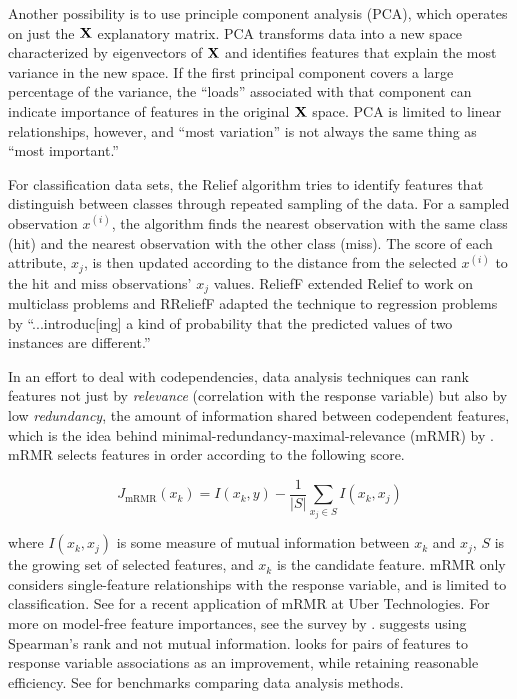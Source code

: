 \documentclass[smallextended]{svjour3}       %
\renewcommand{\xi}{x^{(i)}}
\begin{document}
Another possibility is to use principle component analysis (PCA), which operates on just the $\bf X$ explanatory matrix. PCA transforms data into a new space characterized by eigenvectors of $\bf X$ and identifies features that explain the most variance in the new space. If the first principal component covers a large percentage of the variance, the ``loads'' associated with that component can indicate importance of features in the original $\bf X$ space. PCA is limited to linear relationships, however, and ``most variation'' is not always the same thing as ``most important.''

For classification data sets, the Relief algorithm \citep{relief} tries to identify features that distinguish between classes through repeated sampling of the data. For a sampled observation $\xi$, the algorithm finds the nearest observation with the same class (hit) and the nearest observation with the other class (miss). The score of each attribute, $x_j$, is then updated according to the distance from the selected $\xi$ to the hit and miss observations'  $x_j$ values. ReliefF \citep{ReliefF} extended Relief to work on multiclass problems and RReliefF \citep{RReliefF} adapted the technique to regression problems by ``...introduc[ing] a kind of probability that the predicted values of two instances are different.''

In an effort to deal with codependencies, data analysis techniques can rank features not just by {\em relevance} (correlation with the response variable) but also by low {\em redundancy}, the amount of information shared between codependent features, which is the idea behind minimal-redundancy-maximal-relevance (mRMR) by \citet{mRMR}. mRMR selects features in order according to the following score.

\[
J_{\text{mRMR}}(x_k) = I(x_k, y) - \frac{1}{|S|} \sum_{x_j \in S} I(x_k, x_j)
\]

\noindent where $I(x_k, x_j)$ is some measure of mutual information between $x_k$ and $x_j$, $S$ is the growing set of selected features, and $x_k$ is the candidate feature. mRMR only considers single-feature relationships with the response variable, and is limited to classification. See \cite{ubermRMR} for a recent application of mRMR at Uber Technologies.  For more on model-free feature importances, see the survey by \cite{survey}.  \citet{tsanas} suggests using Spearman's rank and not mutual information. \citet{meyer-microarray} looks for pairs of features to response variable associations as an improvement, while retaining reasonable efficiency. See \citet{filter-benchmark} for benchmarks comparing data analysis methods.
\end{document}
